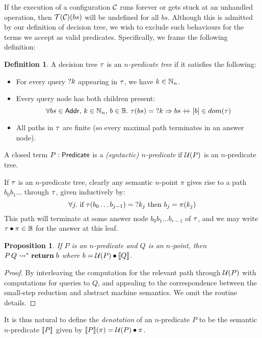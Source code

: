 \documentclass[12pt,phd,lfcs,twoside,openright,logo,leftchapter,normalheadings]{infthesis}
\theoremstyle{plain}
\newtheorem{proposition}[theorem]{Proposition}
\theoremstyle{definition}
\newtheorem{definition}[theorem]{Definition}
\begin{document}
If the execution of a configuration $\mathcal{C}$ runs forever or gets stuck
at an unhandled operation, then $\mathcal{T}(\mathcal{C})(bs)$ will be undefined for
all $bs$.  Although this is admitted by our definition of decision
tree, we wish to exclude such behaviours for the terms we accept as
valid predicates. Specifically, we frame the following definition:

\begin{definition}  \label{def:n-predicate}
A decision tree $\tau$ is an \emph{$n$-predicate tree} if it satisfies the following:
\begin{itemize}
  \item For every query $\mathord{?} k$ appearing in $\tau$, we have $k \in \mathbb{N}_n$.
  \item Every query node has both children present:
  \[ \forall bs \in \mathsf{Addr},\, k \in \mathbb{N}_n,\, b \in \mathbb{B}.~ \tau(bs) = \mathord{?} k \Rightarrow bs \mathbin{+\!\!+} [b] \in dom(\tau) \]
  \item All paths in $\tau$ are finite (so every maximal path terminates in an answer node).
\end{itemize}
A closed term $P: \mathsf{Predicate}$ is a \emph{(syntactic) $n$-predicate} if $\mathcal{U}(P)$ is an $n$-predicate tree.
\end{definition}

If $\tau$ is an $n$-predicate tree, clearly any semantic $n$-point
$\pi$ gives rise to a path $b_0 b_1 \dots $ through $\tau$, given
inductively by: {
\[  \forall j.~ \mbox{if~} \tau(b_0\dots b_{j-1}) = \mathord{?} k_j \mbox{~then~} b_j = \pi(k_j)  \]
}%
This path will terminate at some answer node $b_0 b_1 \dots b_{r-1}$ of $\tau$,
and we may write $\tau \bullet \pi \in \mathbb{B}$ for the answer at this leaf.

\begin{proposition}  \label{prop:pred-tree}
If $P$ is an $n$-predicate and $Q$ is an $n$-point, then
$P\,Q \leadsto^\ast \mathbf{return}\;b$ where $b = \tru(P) \bullet \val{Q}$.
\end{proposition}

\begin{proof}
  By interleaving the computation for the relevant path through
  $\mathcal{U}(P)$ with computations for queries to $Q$, and appealing to the
  correspondence between the small-step reduction and abstract machine
  semantics.  We omit the routine details.
\end{proof}

It is thus natural to define the \emph{denotation} of an $n$-predicate
$P$ to be the semantic $n$-predicate $\val{P}$ given by
$\llbracket P \rrbracket (\pi) = \mathcal{U}(P) \bullet \pi$.
\end{document}
